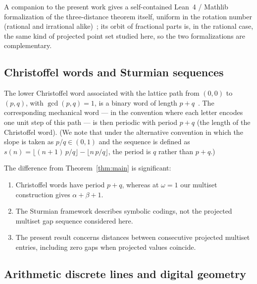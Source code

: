 \documentclass[11pt,reqno]{amsart}
\theoremstyle{plain}
\theoremstyle{definition}
\theoremstyle{remark}
\begin{document}
A companion to the present work gives a self-contained Lean~4 / Mathlib
formalization of the three-distance theorem itself, uniform in the rotation
number (rational and irrational alike)~\cite{KunertThreeGap2026}; its orbit of
fractional parts is, in the rational case, the same kind of projected point set
studied here, so the two formalizations are complementary.

\subsection{Christoffel words and Sturmian sequences}

The lower Christoffel word associated with the lattice path from
\((0,0)\) to \((p,q)\), with \(\gcd(p,q)=1\), is a binary word of length
\(p+q\)~\cite{BerstelEtAl2008}.  The corresponding mechanical
word --- in the convention where each letter encodes one unit step of
this path --- is then periodic with period \(p+q\) (the length of the
Christoffel word).  (We note that under
the alternative convention in which the slope is taken as
\(p/q\in(0,1)\) and the sequence is defined as
\(s(n)=\lfloor(n+1)\,p/q\rfloor-\lfloor n\,p/q\rfloor\), the period is
\(q\) rather than \(p+q\).)

The difference from Theorem~\ref{thm:main} is significant:
\begin{enumerate}
    \item Christoffel words have period \(p+q\), whereas at \(\omega = 1\)
          our multiset construction gives \(\alpha+\beta+1\).
    \item The Sturmian framework describes symbolic codings, not the
          projected multiset gap sequence considered here.
    \item The present result concerns distances between consecutive projected
          multiset entries, including zero gaps when projected values
          coincide.
\end{enumerate}

\subsection{Arithmetic discrete lines and digital geometry}
\end{document}
